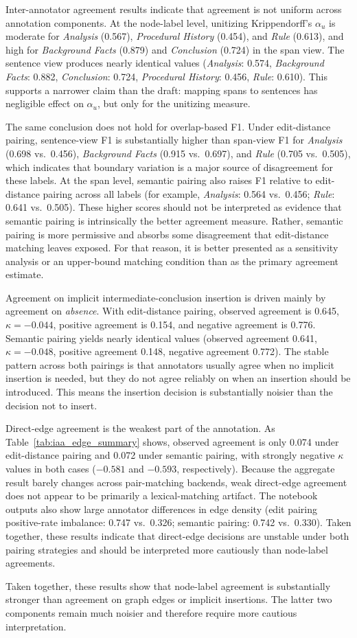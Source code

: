 Inter-annotator agreement results indicate that agreement is not uniform across annotation components. At the node-label level, unitizing Krippendorff's $\alpha_u$ is moderate for \textit{Analysis} (0.567), \textit{Procedural History} (0.454), and \textit{Rule} (0.613), and high for \textit{Background Facts} (0.879) and \textit{Conclusion} (0.724) in the span view. The sentence view produces nearly identical values (\textit{Analysis}: 0.574, \textit{Background Facts}: 0.882, \textit{Conclusion}: 0.724, \textit{Procedural History}: 0.456, \textit{Rule}: 0.610). This supports a narrower claim than the draft: mapping spans to sentences has negligible effect on $\alpha_u$, but only for the unitizing measure.

The same conclusion does not hold for overlap-based F1. Under edit-distance pairing, sentence-view F1 is substantially higher than span-view F1 for \textit{Analysis} (0.698 vs.\ 0.456), \textit{Background Facts} (0.915 vs.\ 0.697), and \textit{Rule} (0.705 vs.\ 0.505), which indicates that boundary variation is a major source of disagreement for these labels. At the span level, semantic pairing also raises F1 relative to edit-distance pairing across all labels (for example, \textit{Analysis}: 0.564 vs.\ 0.456; \textit{Rule}: 0.641 vs.\ 0.505). These higher scores should not be interpreted as evidence that semantic pairing is intrinsically the better agreement measure. Rather, semantic pairing is more permissive and absorbs some disagreement that edit-distance matching leaves exposed. For that reason, it is better presented as a sensitivity analysis or an upper-bound matching condition than as the primary agreement estimate.

Agreement on implicit intermediate-conclusion insertion is driven mainly by agreement on \emph{absence}. With edit-distance pairing, observed agreement is 0.645, $\kappa=-0.044$, positive agreement is 0.154, and negative agreement is 0.776. Semantic pairing yields nearly identical values (observed agreement 0.641, $\kappa=-0.048$, positive agreement 0.148, negative agreement 0.772). The stable pattern across both pairings is that annotators usually agree when no implicit insertion is needed, but they do not agree reliably on when an insertion should be introduced. This means the insertion decision is substantially noisier than the decision not to insert.

Direct-edge agreement is the weakest part of the annotation. As Table~\ref{tab:iaa_edge_summary} shows, observed agreement is only 0.074 under edit-distance pairing and 0.072 under semantic pairing, with strongly negative $\kappa$ values in both cases ($-0.581$ and $-0.593$, respectively). Because the aggregate result barely changes across pair-matching backends, weak direct-edge agreement does not appear to be primarily a lexical-matching artifact. The notebook outputs also show large annotator differences in edge density (edit pairing positive-rate imbalance: 0.747 vs.\ 0.326; semantic pairing: 0.742 vs.\ 0.330). Taken together, these results indicate that direct-edge decisions are unstable under both pairing strategies and should be interpreted more cautiously than node-label agreements.

Taken together, these results show that node-label agreement is substantially stronger than agreement on graph edges or implicit insertions. The latter two components remain much noisier and therefore require more cautious interpretation.
